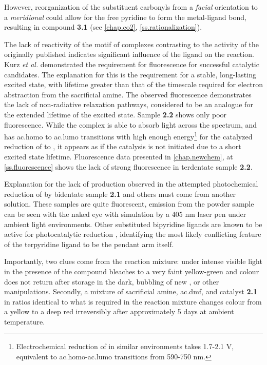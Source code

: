 
 However, reorganization of the substituent carbonyls from a \textit{facial} orientation to a \textit{meridional} could allow for the free pyridine to form the metal-ligand bond, resulting in compound \textbf{3.1} (see \autoref{chap.co2}, \autoref{ss.rationalization}).

The lack of reactivity of the  motif of complexes contrasting to the activity of the originally published  indicates significant influence of the ligand on the reaction. Kurz \textit{et al.} demonstrated the requirement for fluorescence for successful catalytic candidates\autocite{kurz2006}. The explanation for this is the requirement for a stable, long-lasting excited state, with lifetime greater than that of the timescale required for electron abstraction from the sacrificial amine. The observed fluorescence demonstrates the lack of non-radiative relaxation pathways, considered to be an analogue for the extended lifetime of the excited state. Sample \textbf{2.2} shows only poor fluorescence. While the complex is able to absorb light across the spectrum, and has \gls{ac.homo} to \gls{ac.lumo} transitions with high enough energy\footnote{Electrochemical reduction of  in similar environments takes 1.7-2.1 V, equivalent to \gls{ac.homo}-\gls{ac.lumo} transitions from 590-750 nm\autocite{grills2014}.} for the catalyzed reduction of  to , it appears as if the catalysis is not initiated due to a short excited state lifetime. Fluorescence data presented in \autoref{chap.newchem}, at \autoref{ss.fluorescence} shows the lack of strong fluorescence in terdentate sample \textbf{2.2}.

Explanation for the lack of  production observed in the attempted photochemical reduction of  by bidentate sample \textbf{2.1} and others must come from another solution. These samples are quite fluorescent, emission from the powder sample can be seen with the naked eye with simulation by a 405 nm laser pen under ambient light environments.  Other substituted bipyridine ligands are known to be active for photocatalytic reduction \autocite{hawecker1986, kurz2006}, identifying the most likely conflicting feature of the terpyridine ligand to be the pendant arm itself.

Importantly, two clues come from the reaction mixture: under intense visible light in the presence of  the compound bleaches to a very faint yellow-green and colour does not return after storage in the dark, bubbling of new , or other manipulations. Secondly, a mixture of sacrificial amine, \gls{ac.dmf}, and catalyst \textbf{2.1} in ratios identical to what is required in the reaction mixture changes colour from a yellow to a deep red irreversibly after approximately 5 days at ambient temperature. 

